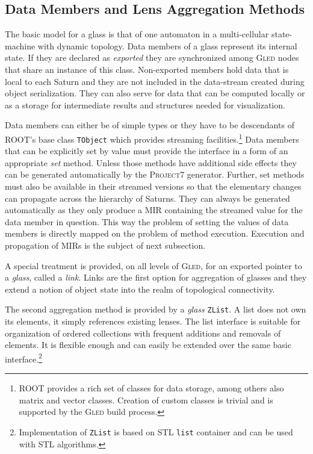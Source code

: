 \documentclass[a4paper,11pt]{article}
\def\gled{\textsc{Gled}\xspace}
\def\p7{\textsc{Project7}\xspace}
\def\smalltt#1{{\small\texttt{#1}}}
\begin{document}
\subsection{Data Members and Lens Aggregation Methods}
\label{ssec:dm_dmlam}

The basic model for a glass is that of one automaton in a
multi-cellular state-machine with dynamic topology. Data members of a
glass represent its internal state. If they are declared as
\emph{exported} they are synchronized among \gled nodes that share an
instance of this class. Non-exported members hold data that is local
to each Saturn and they are not included in the data-stream created
during object serialization. They can also serve for data that can be
computed locally or as a storage for intermediate results and
structures needed for visualization.

Data members can either be of simple types or they have to be
descendants of ROOT's base class \smalltt{TObject} which provides
streaming facilities.\footnote{%
  ROOT provides a rich set of classes for data storage, among others
  also matrix and vector classes. Creation of custom classes is
  trivial and is supported by the \gled build process.} %
Data members that can be explicitly set by value must provide the
interface in a form of an appropriate \emph{set} method. Unless those
methods have additional side effects they can be generated
automatically by the \p7 generator. Further, set methods must also be
available in their streamed versions so that the elementary changes
can propagate across the hierarchy of Saturns. They can always be
generated automatically as they only produce a MIR containing the
streamed value for the data member in question. This way the problem
of setting the values of data members is directly mapped on the
problem of method execution. Execution and propagation of MIRs is the
subject of next subsection.

A special treatment is provided, on all levels of \gled, for an
exported pointer to a \emph{glass}, called a \emph{link}. Links are
the first option for aggregation of glasses and they extend a notion
of object state into the realm of topological connectivity.

The second aggregation method is provided by a \emph{glass}
\smalltt{ZList}. A list does not own its elements, it simply
references existing lenses. The list interface is suitable for
organization of ordered collections with frequent additions and
removals of elements. It is flexible enough and can easily be extended
over the same basic interface.\footnote{Implementation of
  \smalltt{ZList} is based on STL \smalltt{list} container and can be
  used with STL algorithms.}
\end{document}
